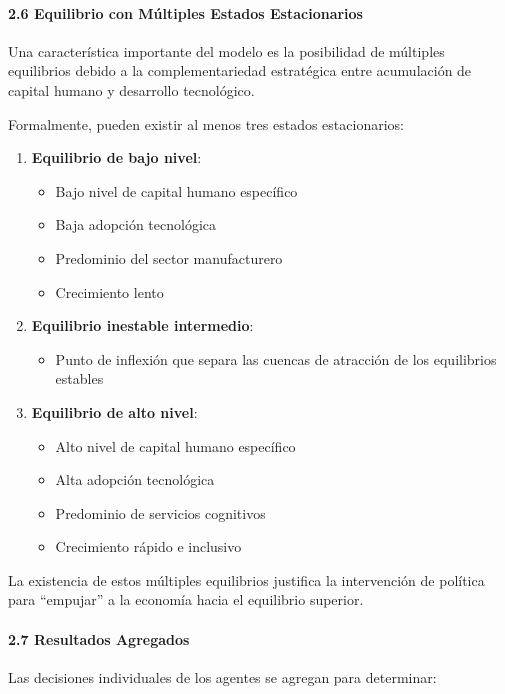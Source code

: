\documentclass{article}
\theoremstyle{remark}
\theoremstyle{definition}
\begin{document}
\begin{tcolorbox}
\paragraph{2.6 Equilibrio con Múltiples Estados Estacionarios}
Una característica importante del modelo es la posibilidad de múltiples equilibrios debido a la complementariedad estratégica entre acumulación de capital humano y desarrollo tecnológico.

Formalmente, pueden existir al menos tres estados estacionarios:

\begin{enumerate}
\item \textbf{Equilibrio de bajo nivel}:
\begin{itemize}
\item Bajo nivel de capital humano específico
\item Baja adopción tecnológica
\item Predominio del sector manufacturero
\item Crecimiento lento
\end{itemize}

\item \textbf{Equilibrio inestable intermedio}:
\begin{itemize}
\item Punto de inflexión que separa las cuencas de atracción de los equilibrios estables
\end{itemize}

\item \textbf{Equilibrio de alto nivel}:
\begin{itemize}
\item Alto nivel de capital humano específico
\item Alta adopción tecnológica
\item Predominio de servicios cognitivos
\item Crecimiento rápido e inclusivo
\end{itemize}
\end{enumerate}

La existencia de estos múltiples equilibrios justifica la intervención de política para ``empujar'' a la economía hacia el equilibrio superior.

\paragraph{2.7 Resultados Agregados}
Las decisiones individuales de los agentes se agregan para determinar:


\end{tcolorbox}
\end{document}

